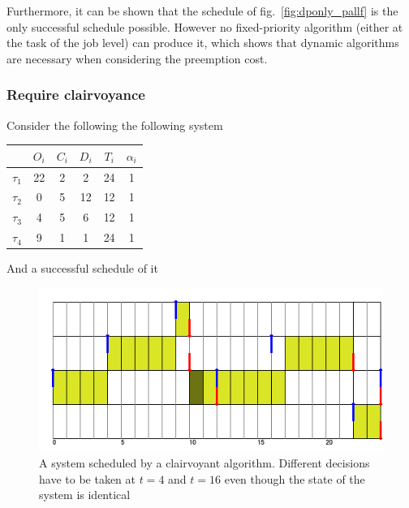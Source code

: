 \documentclass[a4paper,10pt]{article}
\begin{document}
        Furthermore, it can be shown that the schedule of fig.~\ref{fig:dponly_pallf} is the only successful schedule possible. However no fixed-priority algorithm (either at the task of the job level) can produce it, which shows that dynamic algorithms are necessary when considering the preemption cost.


        \subsubsection{Require clairvoyance}

        Consider the following the following system

        \begin{center}
            \begin{tabular}{|r|c|c|c|c|c|}
                \hline
                            & $O_i$ & $C_i$ & $D_i$ & $T_i$ & $\alpha_i$ \\ \hline
                $\tau_1$    & 22    & 2     & 2    & 24    & 1     \\ \hline
                $\tau_2$    & 0     & 5     & 12   & 12    & 1     \\ \hline
                $\tau_3$    & 4     & 5     & 6    & 12    & 1     \\ \hline
                $\tau_4$    & 9     & 1     & 1    & 24    & 1     \\ \hline
            \end{tabular}
        \end{center}

        And a successful schedule of it

        \begin{figure}[H]
        \begin{center}
            \includegraphics[scale=0.7]{figs/clairvoyance_example.png}
            \caption{A system scheduled by a clairvoyant algorithm. Different decisions have to be taken at $t=4$ and $t=16$ even though the state of the system is identical}
            \label{fig:clairvoyance}
        \end{center}
        \end{figure}
\end{document}
